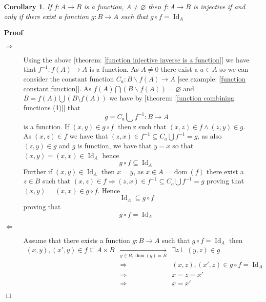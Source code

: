 \documentclass{book}
\newcommand{\Rightarrowlim}{\mathop{\rightarrow}\limits}
\newcommand{\of}{:}
\newcommand{\tmop}[1]{\ensuremath{\operatorname{#1}}}
\newenvironment{proof}{\noindent\textbf{Proof\ }}{\hspace*{\fill}$\Box$\medskip}
\newtheorem{corollary}{Corollary}
\begin{document}
\begin{corollary}
  \label{function injection condition}If $f : A \rightarrow B$ is a function,
  $A \neq \varnothing$ then $f : A \rightarrow B$ is injective if and only if
  there exist a function $g : B \rightarrow A$ such that $g \circ f =
  \tmop{Id}_A$
\end{corollary}

\begin{proof}
  
  \begin{description}
    \item[$\Rightarrow$] Using the above [theorem: \ref{function injective
    inverse is a function}] we have that $f^{- 1} : f (A) \rightarrow A$ is a
    function. As $A \neq 0$ there exist a $a \in A$ so we can consider the
    constant function $C_a : B\backslash f (A) \rightarrow A$ [see example:
    \ref{function constant function}]. As $f (A) \bigcap (B\backslash f (A)) =
    \varnothing$ and $B = f (A) \bigcup (B \setminus f (A))$ we have by
    [theorem: \ref{function combining functions (1)}] that
    \[ g = C_a \bigcup f^{- 1} \of B \rightarrow A \]
    is a function. If $(x, y) \in g \circ f$ $\tmop{then}${\exists}z such that
    $(x, z) \in f \wedge (z, y) \in g$. As $(x, z) \in f$ we have that $(z, x)
    \in f^{- 1} \subseteq C_a \bigcup f^{- 1} = g$, as also $(z, y) \in g$ and
    $g$ is function, we have that $y = x$ so that $(x, y) = (x, x) \in
    \tmop{Id}_A$ hence
    \[ g \circ f \subseteq \tmop{Id}_A \]
    Further if $(x, y) \in \tmop{Id}_A$ then $x = y$, as $x \in A = \tmop{dom}
    (f)$ there exist a $z \in B$ such that $(x, z) \in f \Rightarrow (z, x)
    \in f^{- 1} \subseteq C_a \bigcup f^{- 1} = g$ proving that $(x, y) = (x,
    x) \in g \circ f$. Hence
    \[ \tmop{Id}_A \subseteq g \circ f \]
    proving that
    \[ g \circ f = \tmop{Id}_A \]
    \item[$\Leftarrow$] Assume that there exists a function $g : B \rightarrow
    A$ such that $g \circ f = \tmop{Id}_A$ then
    \begin{eqnarray*}
      (x, y), (x', y) \in f \subseteq A \times B & \Rightarrowlim_{y \in B,
      \tmop{dom} (g) = B} & \exists z \vdash (y, z) \in g\\
      & \Rightarrow & (x, z), (x', z) \in g \circ f = \tmop{Id}_A\\
      & \Rightarrow & x = z = x'\\
      & \Rightarrow & x = x'
    \end{eqnarray*}
  \end{description}
\end{proof}
\end{document}
